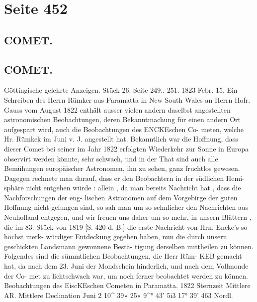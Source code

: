 \documentclass[10pt,a4paper]{article}
\begin{document}
\newpage
\section*{Seite 452}

\subsection*{COMET.}

\subsection*{COMET.}

Göttingische  gelehrte  Anzeigen.     Stück  26.  Seite  249.. 251.     1823  Febr.  15.
Ein  Schreiben  des  Herrn  Rümker  aus  Paramatta  in  New  South  Wales  an  Herrn  Hofr.  Gauss  vom
August  1822  enthält  ausser  vielen  andern  daselbst  angestellten  astronomischen  Beobachtungen,  deren
Bekanntmachung  für  einen  andern  Ort  aufgespart  wird,  auch  die  Beobachtungen  des  ENCKEschen  Co-
meten,  welche  Hr.  Rümkek  im  Juni  v.  J.  angestellt  hat.  Bekanntlich  war  die  Hoffnung,  dass  dieser
Comet  bei  seiner  im  Jahr  1822  erfolgten  Wiederkehr  zur  Sonne  in  Europa  observirt  werden  könnte,  sehr
schwach,  und  in  der  That  sind  auch  alle  Bemühungen  europäischer  Astronomen,  ihn  zu  sehen,  ganz
fruchtlos  gewesen.  Dagegen  rechnete  man  darauf,  dass  er  den  Beobachtern  in  der  südlichen  Hemi-
sphäre nicht  entgehen  würde :  allein ,  da  man  bereits  Nachricht  hat ,  dass  die  Nachforschungen  der  eng-
lischen Astronomen  auf  dem  Vorgebirge  der  guten  Hoffnung  nicht  gelungen  sind,  so  sah  man  um  so
sehnlicher  den  Nachrichten  aus  Neuholland  entgegen,  und  wir  freuen  uns  daher  um  so  mehr,  in  unsern
Blättern ,  die  im  83.  Stück  von  1819  [S.  420  d.  B.]  die  erste  Nachricht  von  Hrn.  Encke's  so  höchst  merk-
würdiger Entdeckung  gegeben  haben,  nun  die  durch  unsern  geschickten  Landsmann  gewonnene  Bestä-
tigung derselben  mittheilen  zu  können.  Folgendes  sind  die  sümmtlichen  Beobachtungen,  die  Herr  Rüm-
KEB  gemacht  hat,  da  nach  dem  23.  Juni  der  Mondschein  hinderlich,  und  nach  dem  Vollmonde  der  Co-
met zu  lichtschwach  war,  um  noch  ferner  beobachtet  werden  zu  können.
Beobachtungen  des  EiscKEschen  Cometen  in  Paramatta.
1822
Sternzeit
Mittlere  AR.
Mittlere  Declination
Juni    2
10\textasciicircum{}  39\glqq{}»  25«
9\textasciicircum{}°  43'    5i\glqq{}3
17°  39'    46\glqq{}3  Nordl.
\end{document}
